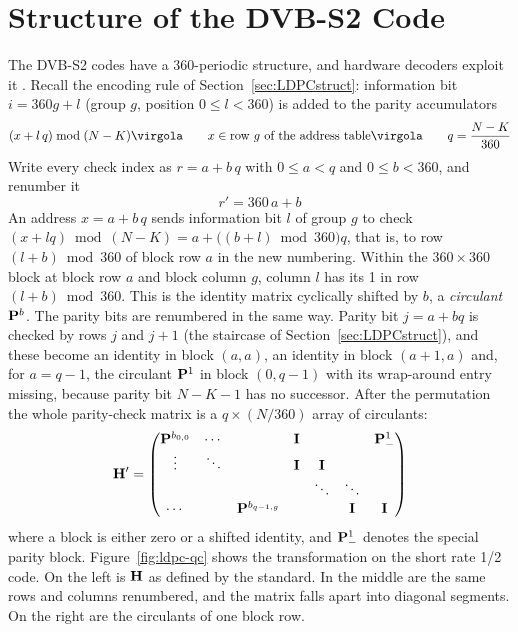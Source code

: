 \section{Structure of the DVB-S2 Code} \label{sec:ldpc-qc}

The DVB-S2 codes have a 360-periodic structure, and hardware decoders exploit it \cite{b:KienleDVBS2, b:UrardDVBS2}. Recall the encoding rule of Section~\ref{sec:LDPCstruct}: information bit \(i = 360 g + l\) (group \(g\), position \(0 \le l < 360\)) is added to the parity accumulators
\begin{equation} \label{eq:ldpc-address}
(x + l\,q) \bmod (N - K) \virgola \qquad x \in \text{row } g \text{ of the address table} \virgola \qquad q = \frac{N - K}{360}
\end{equation}
Write every check index as \(r = a + b\,q\) with \(0 \le a < q\) and \(0 \le b < 360\), and renumber it
\begin{equation} \label{eq:ldpc-perm}
r' = 360\,a + b
\end{equation}
An address \(x = a + b\,q\) sends information bit \(l\) of group \(g\) to check \((x + l q) \bmod (N - K) = a + \big((b + l) \bmod 360\big) q\), that is, to row \((l + b) \bmod 360\) of block row \(a\) in the new numbering. Within the \(360 \times 360\) block at block row \(a\) and block column \(g\), column \(l\) has its 1 in row \((l + b) \bmod 360\). This is the identity matrix cyclically shifted by \(b\), a \emph{circulant} \(\mathbf{P}^b\). The parity bits are renumbered in the same way. Parity bit \(j = a + b q\) is checked by rows \(j\) and \(j + 1\) (the staircase of Section~\ref{sec:LDPCstruct}), and these become an identity in block \((a, a)\), an identity in block \((a+1, a)\) and, for \(a = q - 1\), the circulant \(\mathbf{P}^1\) in block \((0, q-1)\) with its wrap-around entry missing, because parity bit \(N - K - 1\) has no successor. After the permutation the whole parity-check matrix is a \(q \times (N/360)\) array of circulants:
\begin{equation} \label{eq:ldpc-qc}
\mathbf{H}' = \begin{pmatrix}
\mathbf{P}^{b_{0,0}} & \cdots & & \mathbf{I} & & & \mathbf{P}^1_{-} \\
\vdots & \ddots & & \mathbf{I} & \mathbf{I} & & \\
& & & & \ddots & \ddots & \\
\cdots & & \mathbf{P}^{b_{q-1,g}} & & & \mathbf{I} & \mathbf{I}
\end{pmatrix}
\end{equation}
where a block is either zero or a shifted identity, and \(\mathbf{P}^1_{-}\) denotes the special parity block. Figure~\ref{fig:ldpc-qc} shows the transformation on the short rate 1/2 code. On the left is \(\mathbf{H}\) as defined by the standard. In the middle are the same rows and columns renumbered, and the matrix falls apart into diagonal segments. On the right are the circulants of one block row.


